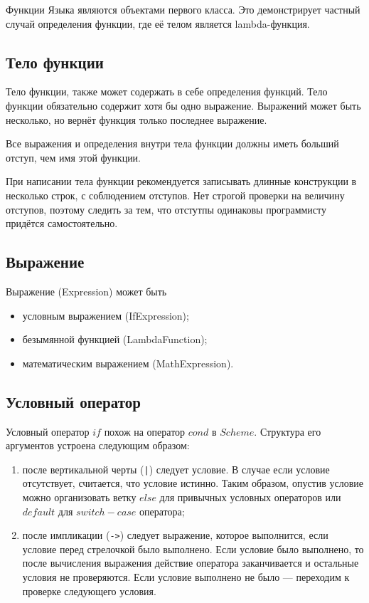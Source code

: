         

        Функции Языка являются объектами первого класса.
        Это демонстрирует частный случай определения функции, где её телом является lambda-функция.

    \subsection{Тело функции}
        Тело функции, также может содержать в себе определения функций.
        Тело функции обязательно содержит хотя бы одно выражение.
        Выражений может быть несколько, но вернёт функция только последнее выражение.

        Все выражения и определения внутри тела функции должны иметь больший отступ, чем имя этой функции.

        При написании тела функции рекомендуется записывать длинные конструкции в несколько строк, с соблюдением отступов.
        Нет строгой проверки на величину отступов, поэтому следить за тем, что отстутпы одинаковы программисту придётся самостоятельно.

        

    \subsection{Выражение}
        Выражение (Expression) может быть
        \begin{itemize}
            \item условным выражением (IfExpression);
            \item безымянной функцией (LambdaFunction);
            \item математическим выражением (MathExpression).
        \end{itemize}

        

    \subsection{Условный оператор}
        Условный оператор $if$ похож на оператор $cond$ в $Scheme$.
        Структура его аргументов устроена следующим образом:
        \begin{enumerate}
            \item после вертикальной черты (\verb,|,) следует условие.
                В случае если условие отсутствует, считается, что условие истинно.
                Таким образом, опустив условие можно организовать ветку $else$ для привычных условных операторов
                или $default$ для $switch-case$ оператора;
            \item после импликации (\verb,->,) следует выражение, которое выполнится, если условие перед стрелочкой было выполнено.
                Если условие было выполнено, то после вычисления выражения действие оператора заканчивается и остальные условия не проверяются.
                Если условие выполнено не было --- переходим к проверке следующего условия.
        \end{enumerate}

